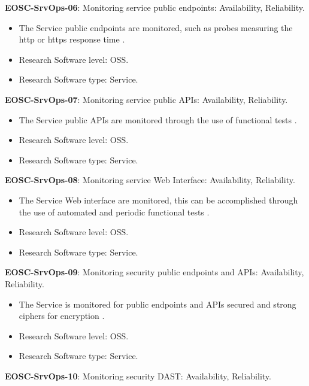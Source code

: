 \textbf{EOSC-SrvOps-06}: Monitoring service public endpoints: Availability, Reliability.

\begin{itemize}
    \item The Service public endpoints are monitored, such as probes measuring the http or https response time \cite{orviz_fernandez_eosc-synergy_2020}.
    \item Research Software level: OSS.
    \item Research Software type: Service.
\end{itemize}

\textbf{EOSC-SrvOps-07}: Monitoring service public APIs: Availability, Reliability.

\begin{itemize}
    \item The Service public APIs are monitored through the use of functional tests \cite{orviz_fernandez_eosc-synergy_2020}.
    \item Research Software level: OSS.
    \item Research Software type: Service.
\end{itemize}

\textbf{EOSC-SrvOps-08}: Monitoring service Web Interface: Availability, Reliability.

\begin{itemize}
    \item The Service Web interface are monitored, this can be accomplished through the use of automated and periodic functional tests \cite{orviz_fernandez_eosc-synergy_2020}.
    \item Research Software level: OSS.
    \item Research Software type: Service.
\end{itemize}

\textbf{EOSC-SrvOps-09}: Monitoring security public endpoints and APIs: Availability, Reliability.

\begin{itemize}
    \item The Service is monitored for public endpoints and APIs secured and strong ciphers for encryption \cite{orviz_fernandez_eosc-synergy_2020}.
    \item Research Software level: OSS.
    \item Research Software type: Service.
\end{itemize}

\textbf{EOSC-SrvOps-10}: Monitoring security DAST: Availability, Reliability.

